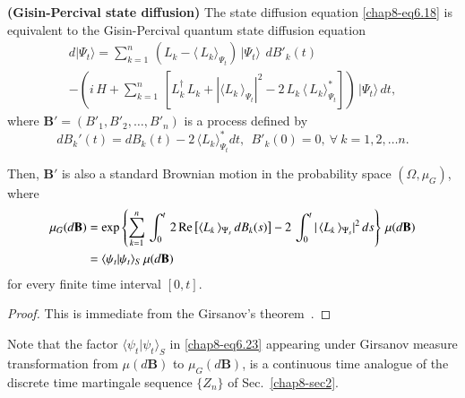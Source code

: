 \begin{coro}
\textbf{(Gisin-Percival state diffusion)} The state diffusion equation \eqref{chap8-eq6.18} is equivalent to the  Gisin-Percival quantum state diffusion equation 
\begin{multline}
d\vert\Psi_t\rangle=\sum_{k=1}^n\, \left(L_k-\langle\, L_k\rangle_{\Psi_t}\right)\, \vert\Psi_t\rangle\, \  dB'_k(t)  \\ 
 - \left(i\, H + \sum_{k=1}^{n}\, \left[ L_k^\dag\, L_k+
\left|\langle L_k\, \rangle_{\Psi_t}\right|^2 -2\, L_k\, \langle\, L_k\rangle^*_{\Psi_t}\right]\right)\, \vert \Psi_t\rangle\, dt,  \label{chap8-eq6.21}
\end{multline}
where  $\mathbf{B}'=(B'_1, B'_2, \ldots , B'_n)$ is a process defined by     
\begin{equation}
dB_k'(t)=dB_k(t) - 2\, \langle L_k\rangle_{\Psi_t}^* dt,\ \ B'_k(0)=0,\ \forall\ k=1,2,\ldots n. \label{chap8-eq6.22}
\end{equation} 
\end{coro}
Then, $\mathbf{B}'$ is also a standard Brownian motion in the probability space $(\Omega, \mu_G)$, where 
{\fontsize{9pt}{11pt} \selectfont
\begin{align}
		\mu_G(d\mathbf{B})&={\rm exp}\left\{\sum_{k=1}^{n}\, \int_0^t\, 2\,{\rm Re}\left[\langle L_k\, \rangle_{\Psi_s}\, dB_k(s)\right] -2\, 
		\int_0^t \vert\,\langle L_k\, \rangle_{\Psi_s}\vert^2\, ds \right\}\, \mu(d\mathbf{B}) \nonumber \\
		&= \langle \psi_t\vert \psi_t\rangle_S\, \mu(d\mathbf{B})  \label{chap8-eq6.23}
\end{align}}
for every finite time interval $[0,t].$

\begin{proof}
This is immediate from the Girsanov's theorem~\cite{chap8-key43}. 
\end{proof}
\begin{remark}
Note that the factor $\langle \psi_t\vert \psi_t\rangle_S$ in \eqref{chap8-eq6.23} appearing under Girsanov measure transformation from $\mu(d\mathbf{B})$ to  $\mu_G(d\mathbf{B})$,  is a continuous time analogue of the discrete time martingale sequence $\{Z_n\}$ of Sec.\ \ref{chap8-sec2}.
\end{remark} 

